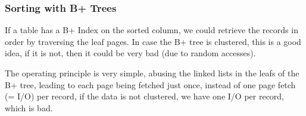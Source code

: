 \subsubsection{Sorting with B+ Trees}
If a table has a B+ Index on the sorted column, we could retrieve the records in order by traversing the leaf pages.
In case the B+ tree is clustered, this is a good idea, if it is not, then it could be very bad (due to random accesses).

The operating principle is very simple, abusing the linked lists in the leafs of the B+ tree, leading to each page being fetched just once,
instead of one page fetch (= I/O) per record, if the data is not clustered, we have one I/O per record, which is bad.
